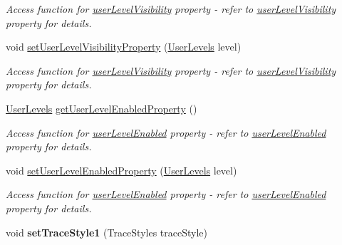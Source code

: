 \begin{DoxyCompactItemize}
\begin{DoxyCompactList}\small\item\em Access function for \hyperlink{classQEPlot_acef17c83a058146755dda5a418624b60}{userLevelVisibility} property -\/ refer to \hyperlink{classQEPlot_acef17c83a058146755dda5a418624b60}{userLevelVisibility} property for details. \end{DoxyCompactList}\item 
\hypertarget{classQEPlot_a272912ba76fb028664f85f1e3de49538}{
void \hyperlink{classQEPlot_a272912ba76fb028664f85f1e3de49538}{setUserLevelVisibilityProperty} (\hyperlink{classQEPlot_a3f70d3a05c74fdd4b58eaeed443bc323}{UserLevels} level)}
\label{classQEPlot_a272912ba76fb028664f85f1e3de49538}

\begin{DoxyCompactList}\small\item\em Access function for \hyperlink{classQEPlot_acef17c83a058146755dda5a418624b60}{userLevelVisibility} property -\/ refer to \hyperlink{classQEPlot_acef17c83a058146755dda5a418624b60}{userLevelVisibility} property for details. \end{DoxyCompactList}\item 
\hypertarget{classQEPlot_a0ccd990d1cd6d29d5abef03e773223a5}{
\hyperlink{classQEPlot_a3f70d3a05c74fdd4b58eaeed443bc323}{UserLevels} \hyperlink{classQEPlot_a0ccd990d1cd6d29d5abef03e773223a5}{getUserLevelEnabledProperty} ()}
\label{classQEPlot_a0ccd990d1cd6d29d5abef03e773223a5}

\begin{DoxyCompactList}\small\item\em Access function for \hyperlink{classQEPlot_acd90a1dd927f697ad58a888a748cff07}{userLevelEnabled} property -\/ refer to \hyperlink{classQEPlot_acd90a1dd927f697ad58a888a748cff07}{userLevelEnabled} property for details. \end{DoxyCompactList}\item 
\hypertarget{classQEPlot_af4713a389386ff0cf48e15371b9c3bc2}{
void \hyperlink{classQEPlot_af4713a389386ff0cf48e15371b9c3bc2}{setUserLevelEnabledProperty} (\hyperlink{classQEPlot_a3f70d3a05c74fdd4b58eaeed443bc323}{UserLevels} level)}
\label{classQEPlot_af4713a389386ff0cf48e15371b9c3bc2}

\begin{DoxyCompactList}\small\item\em Access function for \hyperlink{classQEPlot_acd90a1dd927f697ad58a888a748cff07}{userLevelEnabled} property -\/ refer to \hyperlink{classQEPlot_acd90a1dd927f697ad58a888a748cff07}{userLevelEnabled} property for details. \end{DoxyCompactList}\item 
\hypertarget{classQEPlot_a9876387ff8e9dc956b5ce2ceb2aa131e}{
void {\bfseries setTraceStyle1} (TraceStyles traceStyle)}
\label{classQEPlot_a9876387ff8e9dc956b5ce2ceb2aa131e}


\end{DoxyCompactItemize}
